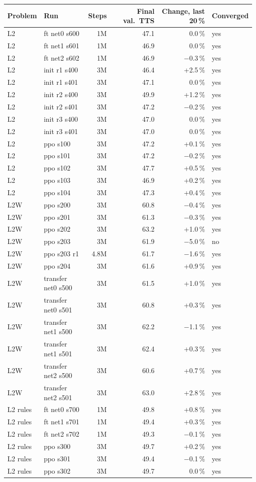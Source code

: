 \begin{tabular}{llrrrl}
\toprule
Problem & Run & Steps & Final val.\ TTS & Change, last 20\,\% & Converged \\
\midrule
L2 & ft net0 s600 & 1M & 47.1 & 0.0\,\% & yes \\
L2 & ft net1 s601 & 1M & 46.9 & 0.0\,\% & yes \\
L2 & ft net2 s602 & 1M & 46.9 & $-$0.3\,\% & yes \\
L2 & init r1 s400 & 3M & 46.4 & +2.5\,\% & yes \\
L2 & init r1 s401 & 3M & 47.1 & 0.0\,\% & yes \\
L2 & init r2 s400 & 3M & 49.9 & +1.2\,\% & yes \\
L2 & init r2 s401 & 3M & 47.2 & $-$0.2\,\% & yes \\
L2 & init r3 s400 & 3M & 47.0 & 0.0\,\% & yes \\
L2 & init r3 s401 & 3M & 47.0 & 0.0\,\% & yes \\
L2 & ppo s100 & 3M & 47.2 & +0.1\,\% & yes \\
L2 & ppo s101 & 3M & 47.2 & $-$0.2\,\% & yes \\
L2 & ppo s102 & 3M & 47.7 & +0.5\,\% & yes \\
L2 & ppo s103 & 3M & 46.9 & +0.2\,\% & yes \\
L2 & ppo s104 & 3M & 47.3 & +0.4\,\% & yes \\
L2W & ppo s200 & 3M & 60.8 & $-$0.4\,\% & yes \\
L2W & ppo s201 & 3M & 61.3 & $-$0.3\,\% & yes \\
L2W & ppo s202 & 3M & 63.2 & +1.0\,\% & yes \\
L2W & ppo s203 & 3M & 61.9 & $-$5.0\,\% & no \\
L2W & ppo s203 r1 & 4.8M & 61.7 & $-$1.6\,\% & yes \\
L2W & ppo s204 & 3M & 61.6 & +0.9\,\% & yes \\
L2W & transfer net0 s500 & 3M & 61.5 & +1.0\,\% & yes \\
L2W & transfer net0 s501 & 3M & 60.8 & +0.3\,\% & yes \\
L2W & transfer net1 s500 & 3M & 62.2 & $-$1.1\,\% & yes \\
L2W & transfer net1 s501 & 3M & 62.4 & +0.3\,\% & yes \\
L2W & transfer net2 s500 & 3M & 60.6 & +0.7\,\% & yes \\
L2W & transfer net2 s501 & 3M & 63.0 & +2.8\,\% & yes \\
L2 rules & ft net0 s700 & 1M & 49.8 & +0.8\,\% & yes \\
L2 rules & ft net1 s701 & 1M & 49.4 & +0.3\,\% & yes \\
L2 rules & ft net2 s702 & 1M & 49.3 & $-$0.1\,\% & yes \\
L2 rules & ppo s300 & 3M & 49.7 & +0.2\,\% & yes \\
L2 rules & ppo s301 & 3M & 49.4 & $-$0.1\,\% & yes \\
L2 rules & ppo s302 & 3M & 49.7 & 0.0\,\% & yes \\
\bottomrule
\end{tabular}
